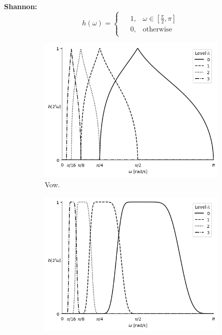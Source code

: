 \documentclass{InsightArticle}
\theoremstyle{definition}
\begin{document}
\noindent\begin{minipage}[t]{0.49\textwidth}
\textbf{Shannon:}
\begin{equation*}
\label{Shannon}
  h(\omega) =
    \begin{cases}
    \begin{aligned}
  &1, &\omega \in [\frac{\pi}{2} , \pi ] \\
  &0, &\text{otherwise}
    \end{aligned}
    \end{cases}
\end{equation*}
\end{minipage}

\begin{figure}[H]
  \centering
  \begin{subfigure}[t]{.49\textwidth}
    \centering
    \includegraphics[width=0.99\textwidth]{profileMotherWavelet_Vow_5_Mother.png}
    \captionsetup{width=\textwidth}
    \caption{Vow.}
    \label{fig:mother_vow}
  \end{subfigure}
  \begin{subfigure}[t]{.49\textwidth}
    \centering
    \includegraphics[width=0.99\textwidth]{profileMotherWavelet_Held_5_Mother.png}

\end{subfigure}
\end{figure}
\end{document}
